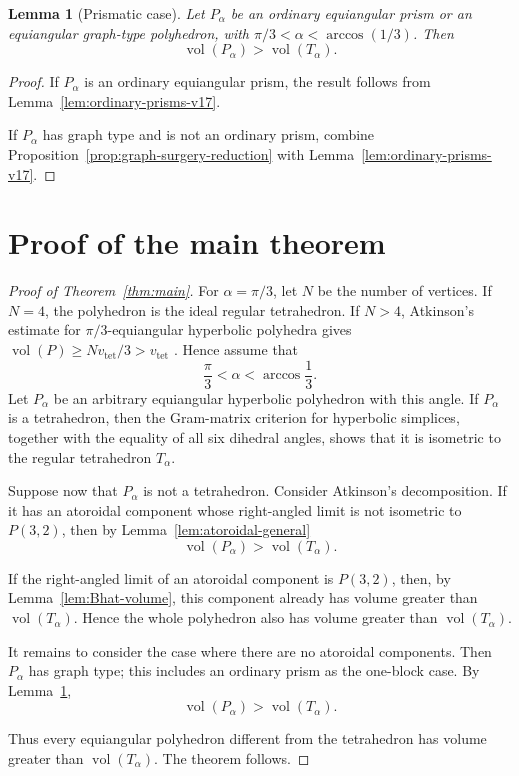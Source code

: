 \documentclass[12pt,a4paper]{article}
\newtheorem{lemma}[theorem]{Lemma}
\theoremstyle{definition}
\DeclareMathOperator{\Vol}{vol}
\newcommand{\vtet}{v_{\mathrm{tet}}}
\begin{document}
\begin{lemma}[Prismatic case]\label{lem:prismatic-estimate-v13}
Let \(P_\alpha\) be an ordinary equiangular prism or an equiangular graph-type
polyhedron, with \(\pi/3<\alpha<\arccos(1/3)\). Then
\[
        \Vol(P_\alpha)>\Vol(T_\alpha).
\]
\end{lemma}

\begin{proof}
If \(P_\alpha\) is an ordinary equiangular prism, the result follows from
Lemma~\ref{lem:ordinary-prisms-v17}.

If \(P_\alpha\) has graph type and is not an ordinary prism, combine
Proposition~\ref{prop:graph-surgery-reduction} with
Lemma~\ref{lem:ordinary-prisms-v17}.
\end{proof}


\section{Proof of the main theorem}

\begin{proof}[Proof of Theorem~\ref{thm:main}]
For \(\alpha=\pi/3\), let \(N\) be the number of vertices.  If \(N=4\), the
polyhedron is the ideal regular tetrahedron.  If \(N>4\), Atkinson's estimate
for \(\pi/3\)-equiangular hyperbolic polyhedra gives
\(\Vol(P)\ge N\vtet/3>\vtet\)
\cite[Theorem~2.6]{AtkinsonEquiangular}.  Hence assume that
\[
        \frac{\pi}{3}<\alpha<\arccos\frac13.
\]
Let \(P_\alpha\) be an arbitrary equiangular hyperbolic polyhedron with this angle. If \(P_\alpha\) is a tetrahedron, then the Gram-matrix criterion for hyperbolic simplices, together with the equality of all six dihedral angles, shows that it is isometric to the regular tetrahedron \(T_\alpha\).

Suppose now that \(P_\alpha\) is not a tetrahedron. Consider Atkinson's decomposition. If it has an atoroidal component whose right-angled limit is not isometric to \(P(3,2)\), then by Lemma~\ref{lem:atoroidal-general}
\[
        \Vol(P_\alpha)>\Vol(T_\alpha).
\]

If the right-angled limit of an atoroidal component is \(P(3,2)\), then, by Lemma~\ref{lem:Bhat-volume}, this component already has volume greater than \(\Vol(T_\alpha)\). Hence the whole polyhedron also has volume greater than \(\Vol(T_\alpha)\).

It remains to consider the case where there are no atoroidal components. Then
\(P_\alpha\) has graph type; this includes an ordinary prism as the one-block
case. By Lemma~\ref{lem:prismatic-estimate-v13},
\[
        \Vol(P_\alpha)>\Vol(T_\alpha).
\]

Thus every equiangular polyhedron different from the tetrahedron has volume greater than \(\Vol(T_\alpha)\). The theorem follows.
\end{proof}
\end{document}
